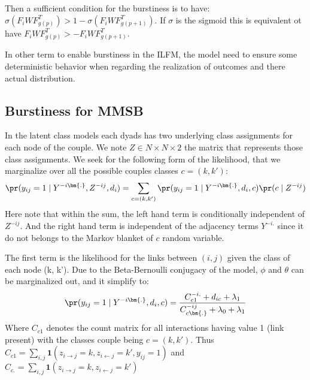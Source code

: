 Then a sufficient condition for the burstiness is to have: $\sigma(F_iWF_{g(p)}^T) > 1- \sigma(F_iWF_{g(p+1)}^T)$. If $\sigma$ is the sigmoid this is equivalent ot have $F_iWF_{g(p)}^T > - F_iWF_{g(p+1)}^T$. 

In other term to enable burstiness in the ILFM, the model need to ensure some deterministic behavior when regarding the realization of outcomes and there actual distribution.

\subsection{Burstiness for MMSB}

\label{burst_class}

In the latent class models each  dyads has two underlying  class assignments for each node of the couple. We note $Z \in N\times N\times 2$ the matrix that represents those class assignments.
We seek for the following form of the likelihood, that we marginalize over all the possible couples classes $c=(k, k')$:
\begin{equation} \label{eq:q}
\pr(y_{ij}=1 \mid Y^{-i\bm{.}}, Z^{-ij}, d_i ) = \sum_{c=(k, k')} \pr(y_{ij}=1 \mid Y^{-i\bm{.}}, d_i , c) \pr(c \mid  Z^{-ij} ) 
\end{equation}
Here note that within the sum, the left hand term is conditionally independent of $Z^{-ij}$. And the right hand term is independent of the adjacency terms $Y^{-i\bm{.}}$ since it do not belongs to the Markov blanket of $c$ random variable.

The first term is the likelihood for the links between $(i,j)$ given the class of each node (k, k'). Due to the Beta-Bernoulli conjugacy of the model, $\phi$ and $\theta$ can be marginalized out, and it simplify to: 
\begin{equation} \label{eq:qc}
\pr(y_{ij}=1 \mid Y^{-i\bm{.}}, d_i , c) = \frac{C_{c1}^{-i.} + d_{ic} + \lambda_1}{C_{c\bm{.}}^{-ij} + \lambda_0+\lambda_1} 
\end{equation}
Where $C_{c1}$ denotes the count matrix for all interactions having value 1 (link present) with the classes couple being $c=(k, k')$. Thus $C_{c1} = \sum_{i,j} \bm{1}(z_{i\rightarrow j}=k, z_{i\leftarrow j}=k', y_{ij}=1)$ and $C_{c.} = \sum_{i,j} \bm{1}(z_{i\rightarrow j}=k, z_{i\leftarrow j}=k')$\\

